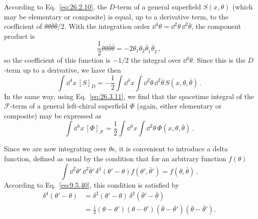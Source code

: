 According to Eq.~\eqref{eq:26.2.10}, the \(D\)-term of a general superfield
\(S(x,\theta)\) (which may be elementary or composite) is equal, up to a
derivative term, to the coefficient of
\(\theta\theta\bar\theta\bar\theta/2\).  With the integration order
\(\dd^4\theta=\dd^2\theta\,\dd^2\bar\theta\), the component product is
\[
  \frac12\theta\theta\bar\theta\bar\theta
  =-2\theta_1\theta_2\bar\theta_{\dot1}\bar\theta_{\dot2}\,,
\]
so the coefficient of this function is \(-1/2\) the integral
over \(\dd^4\theta\). Since this is the \(D\)-term up to a derivative, we have
then
\begin{equation}
  \int \dd^4x\,[S]_D
  =-\frac12\int \dd^4x\int \dd^2\theta\,\dd^2\bar\theta\,
    S(x,\theta,\bar\theta)\,.
  \tag{26.6.5}\label{eq:26.6.5}
\end{equation}
In the same way, using Eq.~\eqref{eq:26.3.11}, we find that the spacetime
integral of the \(\mathcal{F}\)-term of a general left-chiral superfield
\(\Phi\) (again, either elementary or composite) may be expressed as
\begin{equation}
  \int \dd^4x\,[\Phi]_{\mathcal{F}}
  =\frac12\int \dd^4x\int \dd^2\theta\,
    \Phi(x,\theta,\bar\theta)\,.
  \tag{26.6.6}\label{eq:26.6.6}
\end{equation}

Since we are now integrating over \(\theta\)s, it is convenient to introduce
a delta function, defined as usual by the condition that for an arbitrary
function \(f(\theta)\)
\begin{equation}
  \int \dd^2\theta'\,\dd^2\bar\theta'\,
  \delta^4(\theta'-\theta)f(\theta',\bar\theta')
  =f(\theta,\bar\theta)\,.
  \tag{26.6.7}\label{eq:26.6.7}
\end{equation}
According to Eq.~\eqref{eq:9.5.40}, this condition is satisfied by
\begin{equation}
  \begin{aligned}
  \delta^4(\theta'-\theta)
  &=\delta^2(\theta'-\theta)\,
    \delta^2(\bar\theta'-\bar\theta)\\
  &=\frac14
    (\theta-\theta')(\theta-\theta')
    (\bar\theta-\bar\theta')(\bar\theta-\bar\theta').
  \end{aligned}
  \tag{26.6.8}\label{eq:26.6.8}
\end{equation}

